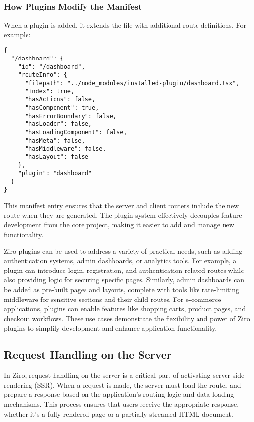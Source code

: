 \subsubsection{How Plugins Modify the Manifest}
When a plugin is added, it extends the  file with additional route definitions. For example:
\begin{verbatim}
{
  "/dashboard": {
    "id": "/dashboard",
    "routeInfo": {
      "filepath": "../node_modules/installed-plugin/dashboard.tsx",
      "index": true,
      "hasActions": false,
      "hasComponent": true,
      "hasErrorBoundary": false,
      "hasLoader": false,
      "hasLoadingComponent": false,
      "hasMeta": false,
      "hasMiddleware": false,
      "hasLayout": false
    },
    "plugin": "dashboard"
  }
}
\end{verbatim}
This manifest entry ensures that the server and client routers include the new  route when they are generated. The plugin system effectively decouples feature development from the core project, making it easier to add and manage new functionality.

Ziro plugins can be used to address a variety of practical needs, such as adding authentication systems, admin dashboards, or analytics tools. For example, a plugin can introduce login, registration, and authentication-related routes while also providing logic for securing specific pages. Similarly, admin dashboards can be added as pre-built pages and layouts, complete with tools like rate-limiting middleware for sensitive sections and their child routes. For e-commerce applications, plugins can enable features like shopping carts, product pages, and checkout workflows. These use cases demonstrate the flexibility and power of Ziro plugins to simplify development and enhance application functionality.

\subsection{Request Handling on the Server}

In Ziro, request handling on the server is a critical part of activating server-side rendering (SSR). When a request is made, the server must load the router and prepare a response based on the application’s routing logic and data-loading mechanisms. This process ensures that users receive the appropriate response, whether it’s a fully-rendered page or a partially-streamed HTML document.

